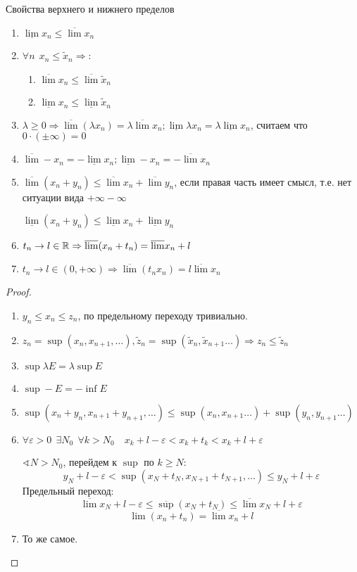 \begin{theorem}
    Свойства верхнего и нижнего пределов
    \begin{enumerate}
        \item $\underline{\lim} x_n \le \overline{\lim} x_n$
        \item $\forall n \ \ x_n \le \tilde x_n \Rightarrow$:
        \begin{enumerate} 
            \item $\overline \lim x_n\le \overline \lim \tilde x_n$
            \item $\underline \lim x_n\le \underline \lim \tilde x_n$
        \end{enumerate}
        \item $\lambda \ge 0 \Rightarrow \overline \lim (\lambda x_n) = \lambda \overline \lim x_n; \underline \lim \lambda x_n = \lambda \underline \lim x_n$, считаем что $0\cdot(\pm\infty)=0$
        \item $\overline \lim -x_n = - \underline \lim x_n ; \underline \lim -x_n = - \overline \lim x_n$
        \item $\overline \lim (x_n + y_n) \le \overline \lim x_n + \overline \lim y_n$, если правая часть имеет смысл, т.е. нет ситуации вида $+\infty - \infty$
        
        $\underline \lim (x_n + y_n) \le \underline \lim x_n + \underline \lim y_n$

        \item $t_n\to l\in\mathbb{R} \Rightarrow \overline \lim (x_n + t_n) = \overline \lim x_n + l$
        \item $t_n\to l\in(0,+\infty) \Rightarrow \overline \lim(t_nx_n) = l \overline \lim x_n$
    \end{enumerate}
\end{theorem}
\begin{proof}
    \begin{enumerate}
        \item $y_n \le x_n \le z_n$, по предельному переходу тривиально.
        \item $z_n=\sup(x_n, x_{n+1}, \ldots), \tilde z_n=\sup(\tilde x_n, \tilde x_{n+1}\ldots) \Rightarrow z_n\le \tilde z_n$
        \item $\sup \lambda E = \lambda\sup E$
        \item $\sup - E = -\inf E$
        \item $\sup(x_n+y_n, x_{n+1}+y_{n+1}, \ldots) \le \sup(x_n, x_{n+1}\ldots) + \sup(y_n, y_{n+1}\ldots)$
        \item $\forall \varepsilon > 0 \ \ \exists N_0 \ \ \forall k > N_0 \quad x_k+l-\varepsilon < x_k + t_k < x_k + l + \varepsilon$
        
        $\sphericalangle N>N_0$, перейдем к $\sup$ по $k\ge N$:
        $$y_N + l - \varepsilon < \sup(x_N + t_N, x_{N+1} + t_{N+1}, \ldots)\le y_N + l + \varepsilon$$
        Предельный переход:
        $$\overline \lim x_N + l - \varepsilon \le \overline \sup (x_N + t_N) \le \overline \lim x_N + l + \varepsilon$$
        $$\lim (x_n + t_n) = \overline \lim x_n + l$$
        \item То же самое.
    \end{enumerate}
\end{proof}

